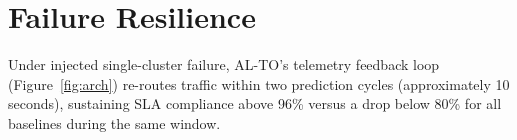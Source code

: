 \section{Failure Resilience}
Under injected single-cluster failure, AL-TO's telemetry feedback loop (Figure~\ref{fig:arch}) re-routes traffic within two prediction cycles (approximately 10 seconds), sustaining SLA compliance above 96\% versus a drop below 80\% for all baselines during the same window.
